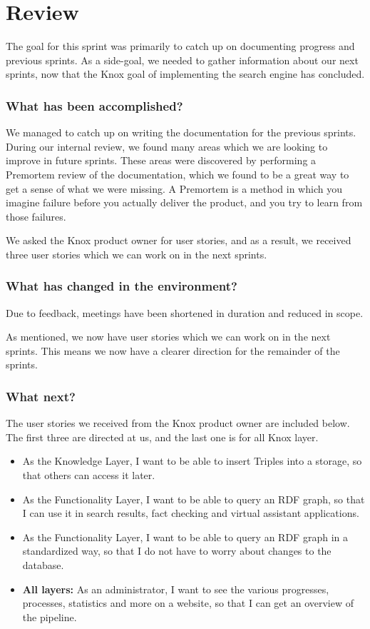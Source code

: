 \section{Review}
The goal for this sprint was primarily to catch up on documenting progress and previous sprints. As a side-goal, we needed to gather information about our next sprints, now that the Knox goal of implementing the search engine has concluded.

\subsubsection*{What has been accomplished?}
We managed to catch up on writing the documentation for the previous sprints. During our internal review, we found many areas which we are looking to improve in future sprints. These areas were discovered by performing a Premortem review of the documentation, which we found to be a great way to get a sense of what we were missing. A Premortem is a method in which you imagine failure before you actually deliver the product, and you try to learn from those failures\cite{PremortemSadanForbedrer}.

We asked the Knox product owner for user stories, and as a result, we received three user stories which we can work on in the next sprints.

\subsubsection*{What has changed in the environment?}
Due to feedback, meetings have been shortened in duration and reduced in scope. 

As mentioned, we now have user stories which we can work on in the next sprints. This means we now have a clearer direction for the remainder of the sprints.

\subsubsection*{What next?}
The user stories we received from the Knox product owner are included below. The first three are directed at us, and the last one is for all Knox layer.

\begin{itemize}
    \item As the Knowledge Layer, I want to be able to insert Triples into a storage, so that others can access it later.
    \item As the Functionality Layer, I want to be able to query an RDF graph, so that I can use it in search results, fact checking and virtual assistant applications.
    \item As the Functionality Layer, I want to be able to query an RDF graph in a standardized way, so that I do not have to worry about changes to the database.
    \item \textbf{All layers:} As an administrator, I want to see the various progresses, processes, statistics and more on a website, so that I can get an overview of the pipeline. 
\end{itemize} 

